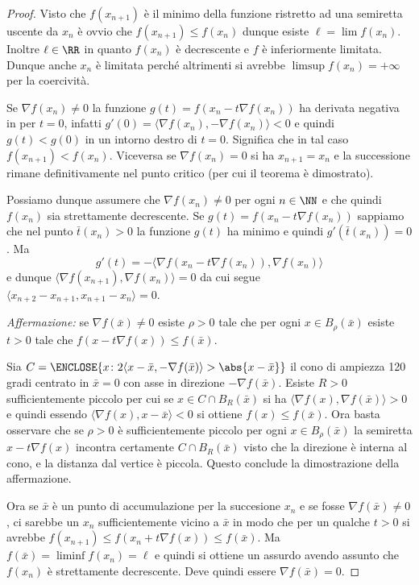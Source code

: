 \begin{proof}
Visto che $f(x_{n+1})$ è il minimo della funzione ristretto 
ad una semiretta uscente da $x_n$ è ovvio che $f(x_{n+1})\le f(x_n)$
dunque esiste $\ell = \lim f(x_n)$. 
Inoltre $\ell\in \RR$ in quanto $f(x_n)$ è decrescente e $f$ è inferiormente 
limitata.
Dunque anche $x_n$ è limitata perché altrimenti si avrebbe $\limsup f(x_n)=+\infty$ 
per la coercività.

Se $\nabla f(x_n)\neq 0$ la funzione
$g(t) = f(x_n - t \nabla f(x_n))$ 
ha derivata negativa in per $t=0$, infatti 
$g'(0) = \langle \nabla f(x_n), -\nabla f(x_n)\rangle < 0$
e quindi $g(t)<g(0)$ in un intorno destro di $t=0$.
Significa che in tal caso $f(x_{n+1}) < f(x_n)$.
Viceversa se $\nabla f(x_n)=0$ si ha $x_{n+1}=x_n$ e la successione
rimane definitivamente nel punto critico (per cui il teorema è dimostrato).

Possiamo dunque assumere che $\nabla f(x_n)\neq 0$ per ogni $n\in \NN$ 
e che quindi $f(x_n)$ sia strettamente decrescente.
Se $g(t) = f(x_n - t \nabla f(x_n))$
sappiamo che nel punto $\bar t(x_n)>0$ la funzione $g(t)$
ha minimo e quindi $g'(\bar t(x_n))=0$.
Ma
\[
  g'(t) 
    = - \langle \nabla f(x_n - t\nabla f(x_n)), \nabla f(x_n)\rangle
\]
e dunque $\langle \nabla f(x_{n+1}), \nabla f(x_n)\rangle=0$
da cui segue $\langle x_{n+2} - x_{n+1}, x_{n+1}-x_n\rangle=0$.

\emph{Affermazione:}
se $\nabla f(\bar x)\neq 0$ esiste $\rho>0$
tale che per ogni $x\in B_\rho(\bar x)$ 
esiste $t>0$ tale che $f(x-t\nabla f(x)) \le f(\bar x)$.

Sia $C=\ENCLOSE{x\colon 2\langle x-\bar x,-\nabla f(\bar x)\rangle > \abs{x-\bar x}}$ il cono 
di ampiezza 120 gradi centrato in $\bar x=0$ con asse in direzione $-\nabla f(\bar x)$.
Esiste $R>0$ sufficientemente piccolo per cui 
se $x\in C\cap B_R(\bar x)$ si ha $\langle \nabla f(x),\nabla f(\bar x)\rangle >0$
e quindi essendo $\langle \nabla f(x),x-\bar x\rangle < 0$
si ottiene $f(x) \le f(\bar x)$.
Ora basta osservare che se $\rho>0$ è sufficientemente piccolo 
per ogni $x\in B_\rho(\bar x)$ la semiretta $x - t \nabla f(x)$
incontra certamente $C\cap B_R(\bar x)$ visto che la direzione 
è interna al cono, e la distanza dal vertice è piccola. 
Questo conclude la dimostrazione della affermazione.

Ora se $\bar x$ è un punto di accumulazione per la succesione $x_n$ 
e se fosse $\nabla f(\bar x)\neq 0$,
ci sarebbe un $x_n$ sufficientemente vicino a $\bar x$ in modo che 
per un qualche $t>0$ si avrebbe $f(x_{n+1})\le f(x_n+t \nabla f(x)) \le f(\bar x)$.
Ma $f(\bar x) = \liminf f(x_n) = \ell$ e quindi si ottiene un assurdo 
avendo assunto che $f(x_n)$ è strettamente decrescente.
Deve quindi essere $\nabla f(\bar x) = 0$.
\end{proof}
